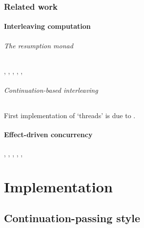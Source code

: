 \documentclass[12pt,phd,lfcs,twoside,openright,logo,leftchapter,normalheadings]{infthesis}
\theoremstyle{plain}
\theoremstyle{definition}
\begin{document}
\section{Related work}
\label{sec:unix-related-work}

\subsection{Interleaving computation}

\paragraph{The resumption monad} \citet{Milner75},
\citet{Plotkin76}, \citet{Moggi90}, \citet{Papaspyrou01}, \citet{Harrison06}, \citet{AtkeyJ15}

\paragraph{Continuation-based interleaving}
First implementation of `threads' is due to \citet{Burstall69}. \citet{Wand80} \citet{HaynesF84} \citet{GanzFW99} \citet{HiebD90}

\subsection{Effect-driven concurrency}
\citet{BauerP15}, \citet{DolanWSYM15}, \citet{Hillerstrom16}, \citet{DolanEHMSW17}, \citet{Convent17}, \citet{Poulson20}

\part{Implementation}

\chapter{Continuation-passing style}
\label{ch:cps}
\end{document}
